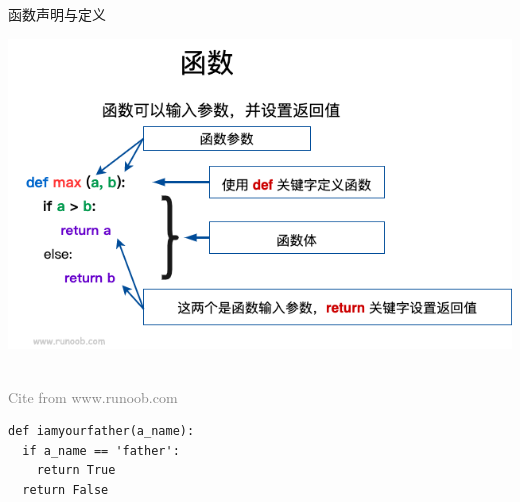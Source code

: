 \documentclass{beamer}
\begin{document}
    \begin{frame}[fragile]{函数声明与定义}
      \begin{center}
        \begin{tcolorbox}[beamer,width=0.7\textwidth,arc=0pt,boxsep=0pt,left=1pt,right=1pt,top=1pt,bottom=1pt]
          \includegraphics[width=\textwidth]{figure/defhs.png}
        \end{tcolorbox}\\
        \textcolor{gray}{\tiny Cite from www.runoob.com}
      \end{center}
      \begin{exampleblock}{}
        \begin{lstlisting}
def iamyourfather(a_name):
  if a_name == 'father':
    return True
  return False 
        \end{lstlisting}
      \end{exampleblock}
    \end{frame}
\end{document}
